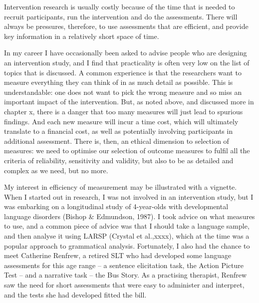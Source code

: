 \documentclass[]{book}
\begin{document}
Intervention research is usually costly because of the time that is needed to recruit participants, run the intervention and do the assessments. There will always be pressures, therefore, to use assessments that are efficient, and provide key information in a relatively short space of time.

In my career I have occasionally been asked to advise people who are designing an intervention study, and I find that practicality is often very low on the list of topics that is discussed. A common experience is that the researchers want to measure everything they can think of in as much detail as possible. This is understandable: one does not want to pick the wrong measure and so miss an important impact of the intervention. But, as noted above, and discussed more in chapter x, there is a danger that too many measures will just lead to spurious findings. And each new measure will incur a time cost, which will ultimately translate to a financial cost, as well as potentially involving participants in additional assessment. There is, then, an ethical dimension to selection of measures: we need to optimise our selection of outcome measures to fulfil all the criteria of reliability, sensitivity and validity, but also to be as detailed and complex as we need, but no more.

My interest in efficiency of measurement may be illustrated with a vignette. When I started out in research, I was not involved in an intervention study, but I was embarking on a longitudinal study of 4-year-olds with developmental language disorders (Bishop \& Edmundson, 1987). I took advice on what measures to use, and a common piece of advice was that I should take a language sample, and then analyse it using LARSP (Crystal et al.,xxxx), which at the time was a popular approach to grammatical analysis. Fortunately, I also had the chance to meet Catherine Renfrew, a retired SLT who had developed some language assessments for this age range -- a sentence elicitation task, the Action Picture Test -- and a narrative task -- the Bus Story. As a practising therapist, Renfrew saw the need for short assessments that were easy to administer and interpret, and the tests she had developed fitted the bill.
\end{document}
